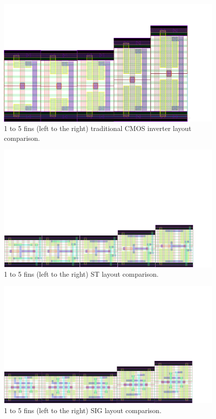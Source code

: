 \documentclass[pgmicro,diss,english]{iiufrgs}
\begin{document}
\begin{figure}[]
\centering
\includegraphics[width=1.5\textwidth, trim={0cm 0cm 4cm 3cm},clip, angle=90]{INVComp.pdf}
\caption{1 to 5 fins (left to the right) traditional CMOS inverter layout comparison.}
\label{fig:invComp}
\end{figure}

\begin{figure}[]
\centering
\includegraphics[width=1.5\textwidth, trim={0cm 0cm 3cm 12cm},clip, angle=90]{STComp.pdf}
\caption{1 to 5 fins (left to the right) ST layout comparison.}
\label{fig:stComp}
\end{figure}

\begin{figure}[]
\centering
\includegraphics[width=1.5\textwidth, trim={0cm 0cm 3cm 12cm},clip, angle=90]{SIGComp.pdf}
\caption{1 to 5 fins (left to the right) SIG layout comparison.}
\label{fig:sigComp}
\end{figure}
\end{document}
